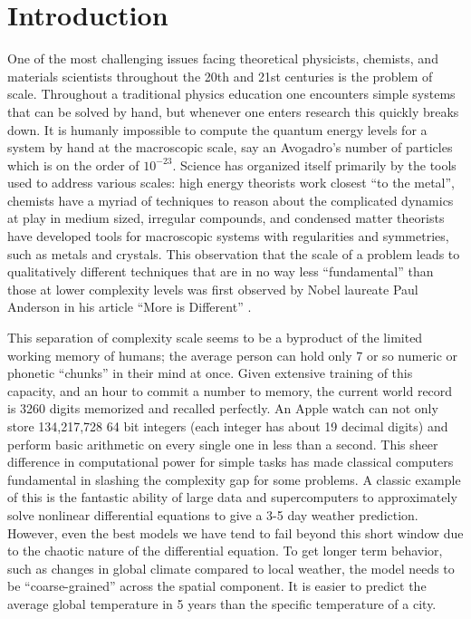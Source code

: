\chapter{Introduction}

One of the most challenging issues facing theoretical physicists, chemists, and materials scientists throughout the 20th and 21st centuries is the problem of scale. Throughout a traditional physics education one encounters simple systems that can be solved by hand, but whenever one enters research this quickly breaks down. It is humanly impossible to compute the quantum energy levels for a system by hand at the macroscopic scale, say an Avogadro's number of particles which is on the order of $10^{-23}$. Science has organized itself primarily by the tools used to address various scales: high energy theorists work closest ``to the metal'', chemists have a myriad of techniques to reason about the complicated dynamics at play in medium sized, irregular compounds, and condensed matter theorists have developed tools for macroscopic systems with regularities and symmetries, such as metals and crystals. This observation that the scale of a problem leads to qualitatively different techniques that are in no way less ``fundamental'' than those at lower complexity levels was first observed by Nobel laureate Paul Anderson in his article ``More is Different'' \cite{moreIsDifferent}.

This separation of complexity scale seems to be a byproduct of the limited working memory of humans; the average person can hold only 7 or so numeric or phonetic ``chunks'' in their mind at once. Given extensive training of this capacity, and an hour to commit a number to memory, the current world record is 3260 digits memorized and recalled perfectly. An Apple watch can not only store 134,217,728 64 bit integers (each integer has about 19 decimal digits) and perform basic arithmetic on every single one in less than a second. This sheer difference in computational power for simple tasks has made classical computers fundamental in slashing the complexity gap for some problems. A classic example of this is the fantastic ability of large data and supercomputers to approximately solve nonlinear differential equations to give a 3-5 day weather prediction. However, even the best models we have tend to fail beyond this short window due to the chaotic nature of the differential equation. To get longer term behavior, such as changes in global climate compared to local weather, the model needs to be ``coarse-grained'' across the spatial component. It is easier to predict the average global temperature in 5 years than the specific temperature of a city. 



